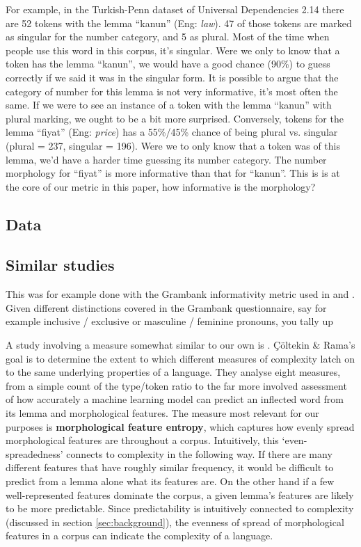 \documentclass[USenglish]{article}
\begin{document}
For example, in the Turkish-Penn dataset of Universal Dependencies 2.14 there are 52 tokens with the lemma ``kanun'' (Eng: \textit{law}). 47 of those tokens are marked as singular for the number category, and 5 as plural. Most of the time when people use this word in this corpus, it's singular.
Were we only to know that a token has the lemma ``kanun'', we would have a good chance (90\%) to guess correctly if we said it was in the singular form.
It is possible to argue that the category of number for this lemma is not very informative, it's most often the same.
If we were to see an instance of a token with the lemma ``kanun'' with plural marking, we ought to be a bit more surprised.
Conversely, tokens for the lemma ``fiyat'' (Eng: \textit{price}) has a 55\%/45\% chance of being plural vs. singular (plural = 237, singular = 196). Were we to only know that a token was of this lemma, we'd have a harder time guessing its number category. The number morphology for ``fiyat'' is more informative than that for ``kanun''.
This is is at the core of our metric in this paper, how informative is the morphology?



\subsection{Data}
\citet{UD_2.14}

\subsection{Similar studies}

This was for example done with the Grambank informativity metric used in \cite{grambank_release} and \citet{shcherbakova2023societies}. Given different distinctions covered in the Grambank questionnaire, say for example inclusive / exclusive or masculine / feminine pronouns, you tally up 

A study involving a measure somewhat similar to our own is \citet{ccoltekin2023complexity}.
Çöltekin \& Rama's goal is to determine the extent to which different measures of complexity latch on to the same underlying properties of a language.
They analyse eight measures, from a simple count of the type/token ratio to the far more involved assessment of how accurately a machine learning model can predict an inﬂected word from its lemma and morphological features.
The measure most relevant for our purposes is \textbf{morphological feature entropy}, which captures how evenly spread morphological features are throughout a corpus.
Intuitively, this `even-spreadedness' connects to complexity in the following way.
If there are many different features that have roughly similar frequency, it would be difficult to predict from a lemma alone what its features are.
On the other hand if a few well-represented features dominate the corpus, a given lemma's features are likely to be more predictable.
Since predictability is intuitively connected to complexity (discussed in section \ref{sec:background}), the evenness of spread of morphological features in a corpus can indicate the complexity of a language.
\end{document}

